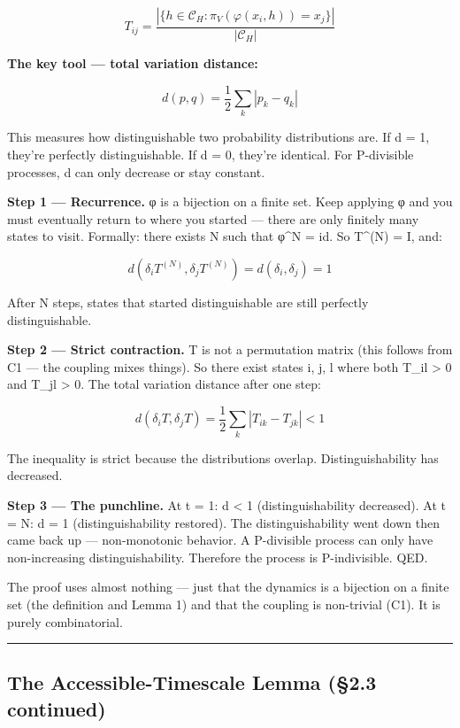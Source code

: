 \documentclass[
]{article}
\begin{document}
\[T_{ij} = \frac{|\{h \in \mathcal{C}_H : \pi_V(\varphi(x_i, h)) = x_j\}|}{|\mathcal{C}_H|}\]

\textbf{The key tool --- total variation distance:}

\[d(p, q) = \frac{1}{2}\sum_k |p_k - q_k|\]

This measures how distinguishable two probability distributions are. If
d = 1, they're perfectly distinguishable. If d = 0, they're identical.
For P-divisible processes, d can only decrease or stay constant.

\textbf{Step 1 --- Recurrence.} φ is a bijection on a finite set. Keep
applying φ and you must eventually return to where you started --- there
are only finitely many states to visit. Formally: there exists N such
that φ\^{}N = id. So T\^{}(N) = I, and:

\[d(\delta_i T^{(N)}, \delta_j T^{(N)}) = d(\delta_i, \delta_j) = 1\]

After N steps, states that started distinguishable are still perfectly
distinguishable.

\textbf{Step 2 --- Strict contraction.} T is not a permutation matrix
(this follows from C1 --- the coupling mixes things). So there exist
states i, j, l where both T\_il \textgreater{} 0 and T\_jl
\textgreater{} 0. The total variation distance after one step:

\[d(\delta_i T, \delta_j T) = \frac{1}{2}\sum_k |T_{ik} - T_{jk}| < 1\]

The inequality is strict because the distributions overlap.
Distinguishability has decreased.

\textbf{Step 3 --- The punchline.} At t = 1: d \textless{} 1
(distinguishability decreased). At t = N: d = 1 (distinguishability
restored). The distinguishability went down then came back up ---
non-monotonic behavior. A P-divisible process can only have
non-increasing distinguishability. Therefore the process is
P-indivisible. QED.

The proof uses almost nothing --- just that the dynamics is a bijection
on a finite set (the definition and Lemma 1) and that the coupling is
non-trivial (C1). It is purely combinatorial.

\begin{center}\rule{0.5\linewidth}{0.5pt}\end{center}

\hypertarget{the-accessible-timescale-lemma-2.3-continued}{%
\subsection{The Accessible-Timescale Lemma (§2.3
continued)}\label{the-accessible-timescale-lemma-2.3-continued}}
\end{document}
